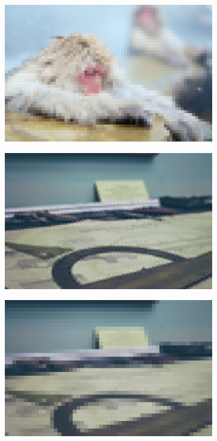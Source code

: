 \documentclass{article}
\begin{document}
\begin{figure}
\begin{subfigure}[b]{0.49 \textwidth}
    \end{subfigure}
    \begin{subfigure}[b]{0.49 \textwidth}
    \includegraphics[width=\textwidth]{Images/autoencoder/reconstructed/512_256_128/test2_80.png}
    \end{subfigure}
    \begin{subfigure}[b]{0.49 \textwidth}
    \includegraphics[width=\textwidth]{Images/autoencoder/reconstructed/512_256/test3_80.png}
    \end{subfigure}
    \begin{subfigure}[b]{0.49 \textwidth}
    \includegraphics[width=\textwidth]{Images/autoencoder/reconstructed/512_256_128/test3_80.png}

\end{subfigure}
\end{figure}
\end{document}
